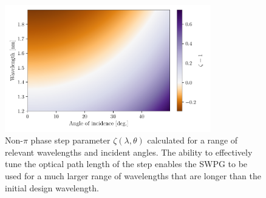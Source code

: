 \begin{figure}
	\centering
	\includegraphics[width=0.8\textwidth]{figures/Two_source/zeta_theta.pdf}
	\caption{Non-$\pi$ phase step parameter $\zeta(\lambda,\theta)$ calculated for a range of relevant wavelengths and incident angles.  The ability to effectively tune the optical path length of the step enables the SWPG to be used for a much larger range of wavelengths that are longer than the initial design wavelength.}
	\label{fig:zeta_theta}
\end{figure}

